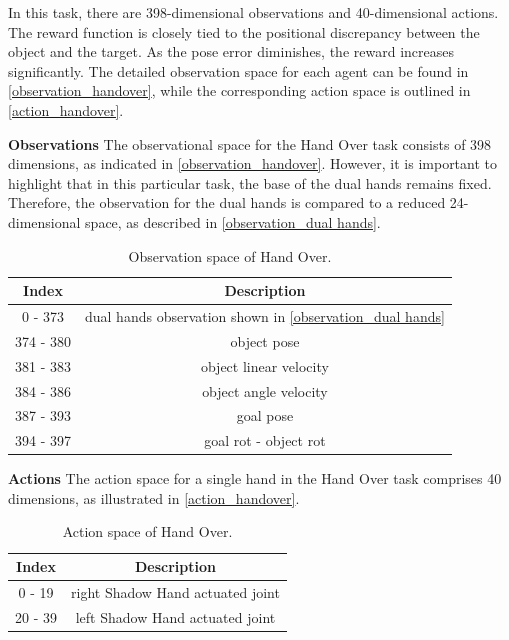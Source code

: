 \documentclass{article}
\begin{document}
In this task, there are 398-dimensional observations and 40-dimensional actions. The reward function is closely tied to the positional discrepancy between the object and the target. As the pose error diminishes, the reward increases significantly. The detailed observation space for each agent can be found in \autoref{observation_handover}, while the corresponding action space is outlined in \autoref{action_handover}.

\textbf{Observations} The observational space for the Hand Over task consists of 398 dimensions, as indicated in \autoref{observation_handover}. However, it is important to highlight that in this particular task, the base of the dual hands remains fixed. Therefore, the observation for the dual hands is compared to a reduced 24-dimensional space, as described in \autoref{observation_dual hands}.

\begin{table}[htbp]
    \centering
    \caption{Observation space of Hand Over.}
    \begin{tabular}{c|c}
    \toprule
    Index&Description\\\hline
    0 - 373&	dual hands observation shown in \autoref{observation_dual hands}\\\hline
    374 - 380&	object pose\\\hline
    381 - 383&	object linear velocity\\\hline
    384 - 386&	object angle velocity\\\hline
    387 - 393&	goal pose\\\hline
    394 - 397&	goal rot - object rot\\
    \bottomrule
    \end{tabular}
    \label{observation_handover}
\end{table}

\textbf{Actions} The action space for a single hand in the Hand Over task comprises 40 dimensions, as illustrated in \autoref{action_handover}.

\begin{table}[htbp]
    \centering
    \caption{Action space of Hand Over.}
    \begin{tabular}{c|c}
    \toprule
    Index&Description\\\hline
    0 - 19&	right Shadow Hand actuated joint \\\hline
    20 - 39&	left Shadow Hand actuated joint\\
    \bottomrule
    \end{tabular}
    \label{action_handover}
\end{table}
\end{document}

